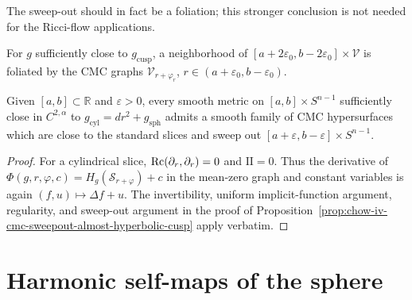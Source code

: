 \begin{remark}
\label{rem:chow-iv-cmc-sweepout-foliation-question}
The sweep-out should in fact be a foliation; this stronger conclusion is not
needed for the Ricci-flow applications.
\end{remark}

\begin{claim}
\label{clm:chow-iv-cmc-cusp-graphs-foliate}
For \(g\) sufficiently close to \(g_{\mathrm{cusp}}\), a neighborhood of
\([a+2\varepsilon_0,b-2\varepsilon_0]\times\mathcal V\) is foliated by the
CMC graphs \(\mathcal V_{r+\varphi_r}\),
\(r\in(a+\varepsilon_0,b-\varepsilon_0)\).
\end{claim}

\begin{proposition}
\label{prop:chow-iv-cmc-spheres-almost-cylindrical-neck}
Given \([a,b]\subset\mathbb R\) and \(\varepsilon>0\), every smooth metric on
\([a,b]\times S^{n-1}\) sufficiently close in \(C^{2,\alpha}\) to
\(g_{\mathrm{cyl}}=dr^2+g_{\mathrm{sph}}\) admits a smooth family of CMC
hypersurfaces which are close to the standard slices and sweep out
\([a+\varepsilon,b-\varepsilon]\times S^{n-1}\).
\end{proposition}
\begin{proof}
For a cylindrical slice, \(\operatorname{Rc}(\partial_r,\partial_r)=0\) and
\(\mathrm{II}=0\).  Thus the derivative of
\(\Phi(g,r,\varphi,c)=H_g(\mathcal S_{r+\varphi})+c\) in the mean-zero graph
and constant variables is again \((f,u)\mapsto\Delta f+u\).  The invertibility,
uniform implicit-function argument, regularity, and sweep-out argument in the
proof of Proposition~\ref{prop:chow-iv-cmc-sweepout-almost-hyperbolic-cusp}
apply verbatim.
\end{proof}

\section{Harmonic self-maps of the sphere}

